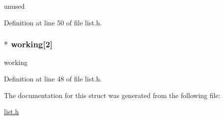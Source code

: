 unused 



Definition at line 50 of file list.\+h.

\hypertarget{structlist__t_a06c2beb66c1b4f8684e734cfef26e698}{}
\subsubsection[{working}]{$\ast$ working\mbox{[}2\mbox{]}}\label{structlist__t_a06c2beb66c1b4f8684e734cfef26e698}


working 



Definition at line 48 of file list.\+h.



The documentation for this struct was generated from the following file\+:\begin{DoxyCompactItemize}
\item 
\hyperlink{list_8h}{list.\+h}\end{DoxyCompactItemize}
